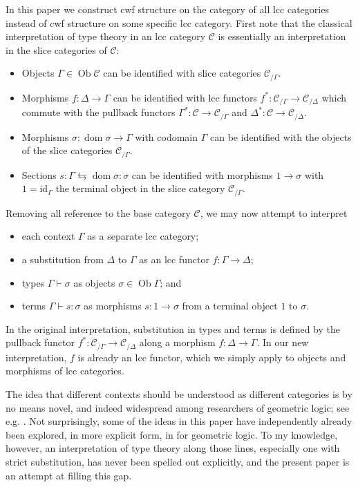 \documentclass[a4paper]{article}
\theoremstyle{remark}
\theoremstyle{definition}
\begin{document}
In this paper we construct cwf structure on the category of all lcc categories instead of cwf structure on some specific lcc category.
First note that the classical interpretation of type theory in an lcc category $\mathcal{C}$ is essentially an interpretation in the slice categories of $\mathcal{C}$:
\begin{itemize}
  \item
    Objects $\Gamma \in \operatorname{Ob} \mathcal{C}$ can be identified with slice categories $\mathcal{C}_{/ \Gamma}$.
  \item
    Morphisms $f : \Delta \rightarrow \Gamma$ can be identified with lcc functors $f^* : \mathcal{C}_{/ \Gamma} \rightarrow \mathcal{C}_{/ \Delta}$ which commute with the pullback functors $\Gamma^* : \mathcal{C} \rightarrow \mathcal{C}_{/ \Gamma}$ and $\Delta^* : \mathcal{C} \rightarrow \mathcal{C}_{/ \Delta}$.
  \item
    Morphisms $\sigma : \operatorname{dom} \sigma \rightarrow \Gamma$ with codomain $\Gamma$ can be identified with the objects of the slice categories $\mathcal{C}_{/ \Gamma}$.
  \item
    Sections $s : \Gamma \leftrightarrows \operatorname{dom} \sigma : \sigma$ can be identified with morphisms $1 \rightarrow \sigma$ with $1 = \mathrm{id}_\Gamma$ the terminal object in the slice category $\mathcal{C}_{/ \Gamma}$.
\end{itemize}
Removing all reference to the base category $\mathcal{C}$, we may now attempt to interpret
\begin{itemize}
  \item
    each context $\Gamma$ as a separate lcc category;
  \item
    a substitution from $\Delta$ to $\Gamma$ as an lcc functor $f : \Gamma \rightarrow \Delta$;
  \item
    types $\Gamma \vdash \sigma$ as objects $\sigma \in \operatorname{Ob} \Gamma$; and
  \item
    terms $\Gamma \vdash s : \sigma$ as morphisms $s : 1 \rightarrow \sigma$ from a terminal object $1$ to $\sigma$.
\end{itemize}
In the original interpretation, substitution in types and terms is defined by the pullback functor $f^* : \mathcal{C}_{/ \Gamma} \rightarrow \mathcal{C}_{/ \Delta}$ along a morphism $f : \Delta \rightarrow \Gamma$.
In our new interpretation, $f$ is already an lcc functor, which we simply apply to objects and morphisms of lcc categories.

The idea that different contexts should be understood as different categories is by no means novel, and indeed widespread among researchers of geometric logic; see e.g. \citet[section 4.5]{locales-and-toposes-as-spaces}.
Not surprisingly, some of the ideas in this paper have independently already been explored, in more explicit form, in \citet{au-sketches} for geometric logic.
To my knowledge, however, an interpretation of type theory along those lines, especially one with strict substitution, has never been spelled out explicitly, and the present paper is an attempt at filling this gap.
\end{document}
